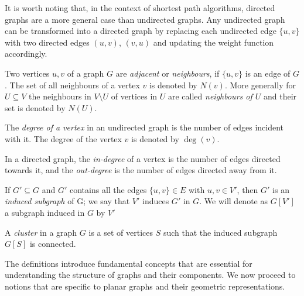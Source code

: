 It is worth noting that, in the context of shortest path algorithms, directed graphs are a more general case than undirected graphs. Any undirected graph can be transformed into a directed graph by replacing each undirected edge $\{u, v\}$ with two directed edges $(u, v)$, $(v, u)$ and updating the weight function accordingly.

\begin{defn} 
    Two vertices $u, v$ of a graph $G$ are \emph{adjacent} or \emph{neighbours}, if $\{u, v\}$ is an edge of $G$. The set of all neighbours of a vertex $v$  is denoted by $N(v)$. More generally for $U \subseteq V$ the neighbours  in $V \setminus U$ of vertices in $U$ are called \emph{neighbours of $U$} and their set is denoted by $N(U)$.  
\end{defn}
    
\begin{defn}
The \emph{degree of a vertex} in an undirected graph is the number of edges incident with it. The degree of the vertex $v$ is denoted by $\deg(v)$.
\end{defn}

\begin{defn}
In a directed graph, the \emph{in-degree} of a vertex is the number of edges directed towards it, and the \emph{out-degree} is the number of edges directed away from it.
\end{defn}

\begin{defn}
    If $G' \subseteq G$ and $G'$ contains all the edges $\{u, v\} \in E$ with $u, v \in V'$, then $G'$ is an \emph{induced subgraph} of G; we say that $V'$ induces $G'$ in $G$. We will denote as $G[V']$ a subgraph induced in $G$ by $V'$
\end{defn}

\begin{defn}
A \emph{cluster} in a graph $G$ is a set of vertices $S$ such that the induced subgraph $G[S]$ is connected.
\end{defn}

The definitions introduce fundamental concepts that are essential for understanding the structure of graphs and their components. We now proceed to notions that are specific to planar graphs and their geometric representations.

